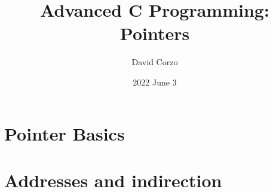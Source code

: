 \documentclass[openany]{book}
\title{Advanced C Programming: Pointers}
\date{2022 June 3}
\author{David Corzo}
\begin{document}
\maketitle
\tableofcontents

\chapter{Pointer Basics}


\chapter{Addresses and indirection}




\end{document}
